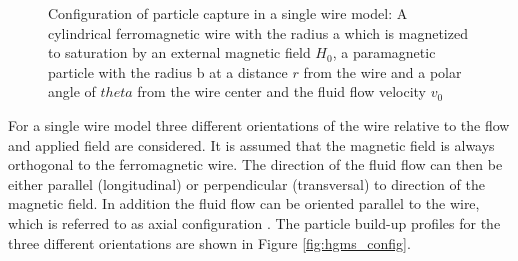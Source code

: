 \begin{figure}[h]
\centering
{}
\caption[Configuration of particle capture in a single wire model]{Configuration of particle capture in a single wire model: A cylindrical ferromagnetic wire with the radius a which is magnetized to saturation by an external magnetic field $H_{0}$, a paramagnetic particle with the radius b at a distance $r$ from the wire and a polar angle of $theta$ from the wire center and the fluid flow velocity $v_{0}$ \cite{svoboda2004magnetic}
\label{fig:wire}
}
\end{figure}

For a single wire model three different orientations of the wire relative to the flow and applied field are considered. It is assumed that the magnetic field is always orthogonal to the ferromagnetic wire. The direction of the fluid flow can then be either parallel (longitudinal) or perpendicular (transversal) to direction of the magnetic field. In addition the fluid flow can be oriented parallel to the wire, which is referred to as axial configuration \cite{friedlaender1978particle}. The particle build-up profiles for the three different orientations are shown in Figure \ref{fig:hgms_config}.   

